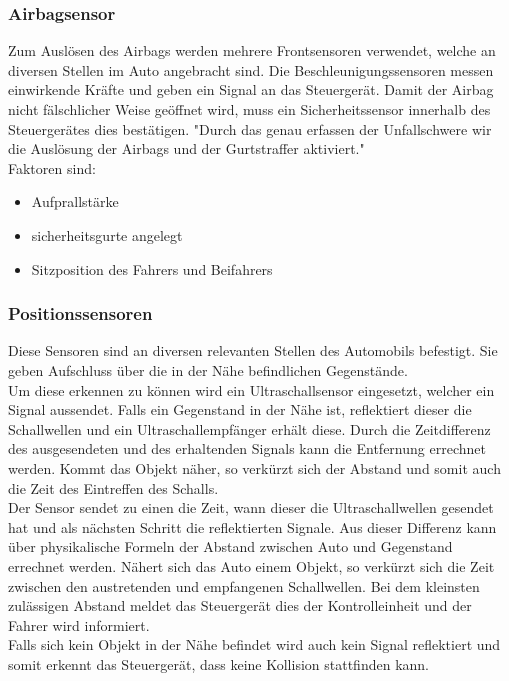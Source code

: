 			\subsubsection{Airbagsensor}
					Zum Auslösen des Airbags werden mehrere Frontsensoren verwendet, welche an diversen Stellen im Auto angebracht sind. Die Beschleunigungssensoren messen einwirkende Kräfte und geben ein Signal an das Steuergerät. Damit der Airbag nicht fälschlicher Weise geöffnet wird, muss ein Sicherheitssensor innerhalb des Steuergerätes dies bestätigen. "Durch das genau erfassen der Unfallschwere wir die Auslösung der Airbags und der Gurtstraffer aktiviert."\cite{TS32}\\
					Faktoren sind: 
					
					\begin{itemize}
						\item Aufprallstärke
						\item sicherheitsgurte angelegt
						\item Sitzposition des Fahrers und Beifahrers
					\end{itemize}
				
				
				\subsubsection{Positionssensoren}
					Diese Sensoren sind an diversen relevanten Stellen des Automobils befestigt. Sie geben Aufschluss über die in der Nähe befindlichen Gegenstände.\\
					Um diese erkennen zu können wird ein Ultraschallsensor eingesetzt, welcher ein Signal aussendet. Falls ein Gegenstand in der Nähe ist, reflektiert dieser die Schallwellen und ein Ultraschallempfänger erhält diese. Durch die Zeitdifferenz des ausgesendeten und des erhaltenden Signals kann die Entfernung errechnet werden. Kommt das Objekt näher, so verkürzt sich der Abstand und somit auch die Zeit des Eintreffen des Schalls.\\
					Der Sensor sendet zu einen die Zeit, wann dieser die Ultraschallwellen gesendet hat und als nächsten Schritt die reflektierten Signale. Aus dieser Differenz kann über physikalische Formeln der Abstand zwischen Auto und Gegenstand errechnet werden. Nähert sich das Auto einem Objekt, so verkürzt sich die Zeit zwischen den austretenden und empfangenen Schallwellen. Bei dem kleinsten zulässigen Abstand meldet das Steuergerät dies der Kontrolleinheit und der Fahrer wird informiert.\\
					Falls sich kein Objekt in der Nähe befindet wird auch kein Signal reflektiert und somit erkennt das Steuergerät, dass keine Kollision stattfinden kann.
				
